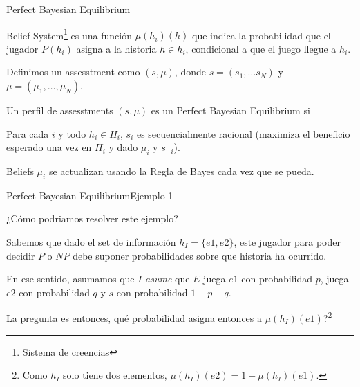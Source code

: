 \documentclass[notes, 11pt]{beamer} %
\newenvironment{wideitemize}{\itemize\addtolength{\itemsep}{10pt}}{\enditemize}
\begin{document}
\begin{frame}{Perfect Bayesian Equilibrium}
	\begin{wideitemize}
		\item<1-> Belief System\footnote{Sistema de creencias} es una funci\'on $\mu(h_{i})(h)$ que indica la probabilidad que el jugador $P(h_{i})$ asigna a la historia $h \in h_{i}$, condicional a que el juego llegue a $h_{i}$.
		\item<2-> Definimos un assesstment como $(s,\mu)$, donde $s=(s_{1},\dots s_{N})$ y $\mu=(\mu_{1},\dots, \mu_{N})$.
		\item<3-> Un perfil de assesstments $(s,\mu)$ es un Perfect Bayesian Equilibrium si
		\begin{wideitemize}
			\item<4->[--] Para cada $i$ y todo $h_{i} \in H_{i}$, $s_{i}$ es secuencialmente racional (maximiza el beneficio esperado una vez en $H_{i}$ y dado $\mu_{i}$ y $s_{-i}$).
			\item<5->[--] Beliefs $\mu_{i}$ se actualizan usando la Regla de Bayes cada vez que se pueda.
		\end{wideitemize}
	\end{wideitemize}
\end{frame}

\begin{frame}{Perfect Bayesian Equilibrium}{Ejemplo 1}
\begin{wideitemize}
	\item<1-> ¿C\'omo podriamos resolver este ejemplo? 
	\item<2-> Sabemos que dado el set de informaci\'on $h_{I} = \{ e1, e2 \}$, este jugador para poder decidir $P$ o $NP$ debe suponer probabilidades sobre que historia ha ocurrido. 
	\item<3-> En ese sentido, asumamos que $I$ \textit{asume} que $E$ juega $e1$ con probabilidad $p$, juega $e2$ con probabilidad $q$ y $s$ con probabilidad $1-p-q$.
	\item<4-> La pregunta es entonces, qu\'e probabilidad asigna entonces a $\mu(h_{I})(e1)$?\footnote{Como $h_{I}$ solo tiene dos elementos, $\mu(h_{I})(e2) = 1 - \mu(h_{I})(e1)$.}
\end{wideitemize}
\end{frame}
\end{document}
